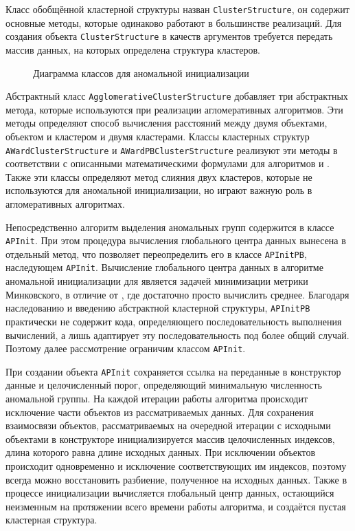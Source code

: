 \documentclass[12pt]{diploma}
\begin{document}
	Класс обобщённой кластерной структуры назван \texttt{ClusterStructure}, он содержит основные методы, которые одинаково работают в большинстве реализаций. Для создания объекта \texttt{ClusterStructure} в качеств аргументов требуется передать массив данных, на которых определена структура кластеров.
	
	\begin{figure}[h!]
		\centering
		
		\caption{Диаграмма классов для аномальной инициализации}
		\label{fig:ap-init-classes}
	\end{figure}
	
	Абстрактный класс \texttt{AgglomerativeClusterStructure} добавляет три абстрактных метода, которые используются при реализации агломеративных алгоритмов. Эти методы определяют способ вычисления расстояний между двумя объектами, объектом и кластером и двумя кластерами.	Классы кластерных структур \texttt{AWardClusterStructure} и \texttt{AWardPBClusterStructure} реализуют эти методы в соответствии с описанными математическими формулами для алгоритмов \AWard и \AWardpb. Также эти классы определяют метод слияния двух кластеров, которые не используются для аномальной инициализации, но играют важную роль в агломеративных алгоритмах.
	
	Непосредственно алгоритм выделения аномальных групп содержится в классе \texttt{APInit}. При этом процедура вычисления глобального центра данных вынесена в отдельный метод, что позволяет переопределить его в классе \texttt{APInitPB}, наследующем \texttt{APInit}. Вычисление глобального центра данных в алгоритме аномальной инициализации для \AWardpb является задачей минимизации метрики Минковского, в отличие от  \AWard, где достаточно просто вычислить среднее. Благодаря наследованию и введению абстрактной кластерной структуры, \texttt{APInitPB} практически не содержит кода, определяющего последовательность выполнения вычислений, а лишь адаптирует эту последовательность под более общий случай. Поэтому далее рассмотрение ограничим классом \texttt{APInit}.
	
	При создании объекта \texttt{APInit} сохраняется ссылка на переданные в конструктор данные и целочисленный порог, определяющий минимальную численность аномальной группы. На каждой итерации работы алгоритма происходит исключение части объектов из рассматриваемых данных. Для сохранения взаимосвязи объектов, рассматриваемых на очередной итерации с исходными объектами в конструкторе инициализируется массив целочисленных индексов, длина которого равна длине исходных данных. При исключении объектов происходит одновременно и исключение соответствующих им индексов, поэтому всегда можно восстановить разбиение, полученное на исходных данных. Также в процессе инициализации вычисляется глобальный центр данных, остающийся неизменным на протяжении всего времени работы алгоритма, и создаётся пустая кластерная структура.
		
\end{document}
